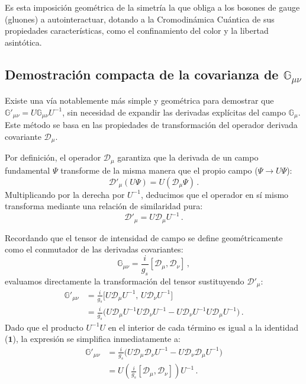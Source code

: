 Es esta imposición geométrica de la simetría la que obliga a los bosones de gauge (gluones) a autointeractuar, dotando a la Cromodinámica Cuántica de sus propiedades características, como el confinamiento del color y la libertad asintótica.


\begin{frame}
\subsection{Demostración compacta de la covarianza de $\mathbb{G}_{\mu\nu}$}

Existe una vía notablemente más simple y geométrica para demostrar que $\mathbb{G}'_{\mu\nu} = U \mathbb{G}_{\mu\nu} U^{-1}$, sin necesidad de expandir las derivadas explícitas del campo $\mathbb{G}_\mu$. Este método se basa en las propiedades de transformación del operador derivada covariante $\mathcal{D}_\mu$.

Por definición, el operador $\mathcal{D}_\mu$ garantiza que la derivada de un campo fundamental $\Psi$ transforme de la misma manera que el propio campo ($\Psi \to U\Psi$):
\begin{equation}
    \mathcal{D}'_\mu (U\Psi) = U (\mathcal{D}_\mu \Psi) \, .
\end{equation}
Multiplicando por la derecha por $U^{-1}$, deducimos que el operador en sí mismo transforma mediante una relación de similaridad pura:
\begin{equation}
    \mathcal{D}'_\mu = U \mathcal{D}_\mu U^{-1} \, .
\end{equation}

Recordando que el tensor de intensidad de campo se define geométricamente como el conmutador de las derivadas covariantes:
\begin{equation}
    \mathbb{G}_{\mu\nu} = \frac{i}{g_s} [\mathcal{D}_\mu, \mathcal{D}_\nu] \, ,
\end{equation}
evaluamos directamente la transformación del tensor sustituyendo $\mathcal{D}'_\mu$:
\begin{align}
    \mathbb{G}'_{\mu\nu} &= \frac{i}{g_s} \Big[ U \mathcal{D}_\mu U^{-1} , \, U \mathcal{D}_\nu U^{-1} \Big] \nonumber \\
    &= \frac{i}{g_s} \Big( U \mathcal{D}_\mu U^{-1} U \mathcal{D}_\nu U^{-1} - U \mathcal{D}_\nu U^{-1} U \mathcal{D}_\mu U^{-1} \Big) \, .
\end{align}
Dado que el producto $U^{-1}U$ en el interior de cada término es igual a la identidad ($\mathbf{1}$), la expresión se simplifica inmediatamente a:
\begin{align}
    \mathbb{G}'_{\mu\nu} &= \frac{i}{g_s} \Big( U \mathcal{D}_\mu \mathcal{D}_\nu U^{-1} - U \mathcal{D}_\nu \mathcal{D}_\mu U^{-1} \Big) \nonumber \\
    &= U \left( \frac{i}{g_s} [\mathcal{D}_\mu, \mathcal{D}_\nu] \right) U^{-1} \, .
\end{align}


\end{frame}
